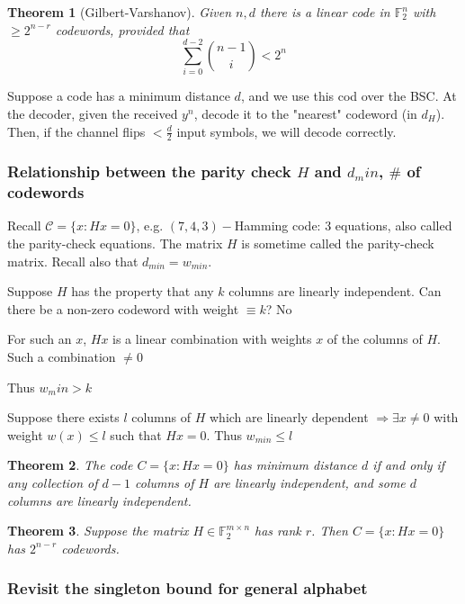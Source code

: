 \documentclass[twoside]{article}
\newtheorem{theorem}{Theorem}[section]
\theoremstyle{definition} %
\def\F{\mathbb{F}}
\def\C{\mathcal{C}}
\begin{document}
\begin{theorem}[Gilbert-Varshanov]
  Given $n,d$ there is a linear code in $\F_2^n$ with $\geq 2 ^{n-r}$ codewords, provided that
  \[
    \sum_{i=0}^{d-2} {n-1 \choose i} < 2^n
  \]
\end{theorem}





Suppose a code has a minimum distance $d$, and we use this cod over the BSC. At the decoder, given the received $y^n$, decode it to the "nearest" codeword (in $d_H$). Then, if the channel flips $< \frac{d}{2}$ input symbols, we will decode correctly.

\subsubsection*{Relationship between the parity check $H$ and $d_min$, $\#$ of codewords}

Recall $\C = \{ x: Hx = 0\}$, e.g. $(7,4,3)-$Hamming code: 3 equations, also called the parity-check equations. The matrix $H$ is sometime called the parity-check matrix. Recall also that $d_{min} = w_{min}$.

Suppose $H$ has the property that any $k$ columns are linearly independent. Can there be a non-zero codeword with weight $\equiv k$? No

For such an $x$, $Hx $ is a linear combination with weights $x$  of the columns of $H$. Such a combination $\neq 0$

Thus $w_min > k$

Suppose there exists $l$ columns of $H$ which are linearly dependent $\Rightarrow \exists x \neq 0$ with weight $w(x) \leq l$ such that $Hx = 0$. Thus $w_{min} \leq l$

\begin{theorem}
  The code $C = \{ x: Hx = 0 \}$ has minimum distance $d$ if and only if any collection of $d-1$ columns of $H$ are linearly independent, and some $d$ columns are linearly independent.
\end{theorem}

\begin{theorem}
  Suppose the matrix $H \in \F_2^{m \times n}$ has rank $r$. Then $C = \{ x: Hx = 0 \}$ has $2^{n - r}$ codewords.
\end{theorem}

\subsubsection{Revisit the singleton bound for general alphabet}
\end{document}

